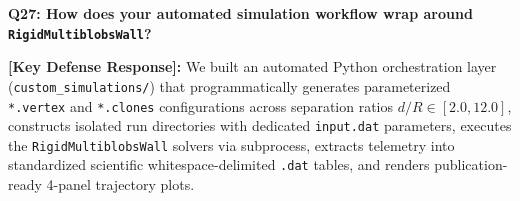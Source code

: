 \documentclass[11pt,a4paper]{article}
\newcommand{\question}[2]{
    \vspace{0.4cm}
    \noindent\colorbox{blue!10}{\parbox{\dimexpr\textwidth-2\fboxsep\relax}{
        \textbf{#1: #2}
    }}
    \vspace{0.2cm}
}
\newcommand{\shortanswer}[1]{
    \noindent\textbf{\textcolor{green!50!black}{[Key Defense Response]:}} #1
    \vspace{0.2cm}
}
\begin{document}
\vspace{0.4cm}
\question{Q27}{How does your automated simulation workflow wrap around \texttt{RigidMultiblobsWall}?}

\shortanswer{We built an automated Python orchestration layer (\texttt{custom\_simulations/}) that programmatically generates parameterized \texttt{*.vertex} and \texttt{*.clones} configurations across separation ratios $d/R \in [2.0, 12.0]$, constructs isolated run directories with dedicated \texttt{input.dat} parameters, executes the \texttt{RigidMultiblobsWall} solvers via subprocess, extracts telemetry into standardized scientific whitespace-delimited \texttt{.dat} tables, and renders publication-ready 4-panel trajectory plots.}
\end{document}
